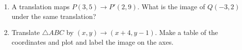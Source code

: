 \begin{enumerate}
\item A translation maps $P(3,5) \rightarrow P'(2,9)$. What is the image of $Q(-3,2)$ under the same translation?

\item Translate $\triangle ABC$ by $(x,y) \rightarrow (x+4, y-1)$. Make a table of the coordinates and plot and label the image on the axes.
  \begin{flushright}
  \end{flushright}

  
  





\end{enumerate}

